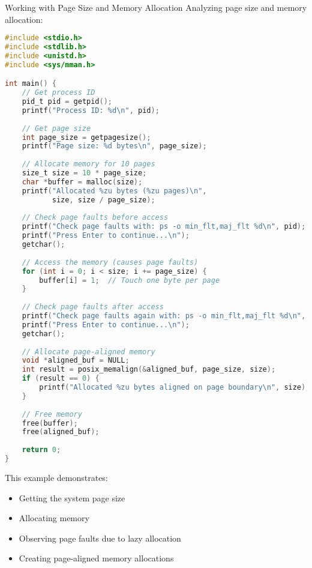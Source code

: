 \begin{example2}{Working with Page Size and Memory Allocation}
    Analyzing page size and memory allocation:
    
\begin{lstlisting}[language=C, style=basesmol]
#include <stdio.h>
#include <stdlib.h>
#include <unistd.h>
#include <sys/mman.h>

int main() {
    // Get process ID
    pid_t pid = getpid();
    printf("Process ID: %d\n", pid);
    
    // Get page size
    int page_size = getpagesize();
    printf("Page size: %d bytes\n", page_size);
    
    // Allocate memory for 10 pages
    size_t size = 10 * page_size;
    char *buffer = malloc(size);
    printf("Allocated %zu bytes (%zu pages)\n", 
           size, size / page_size);
    
    // Check page faults before access
    printf("Check page faults with: ps -o min_flt,maj_flt %d\n", pid);
    printf("Press Enter to continue...\n");
    getchar();
    
    // Access the memory (causes page faults)
    for (int i = 0; i < size; i += page_size) {
        buffer[i] = 1;  // Touch one byte per page
    }
    
    // Check page faults after access
    printf("Check page faults again with: ps -o min_flt,maj_flt %d\n", pid);
    printf("Press Enter to continue...\n");
    getchar();
    
    // Allocate page-aligned memory
    void *aligned_buf = NULL;
    int result = posix_memalign(&aligned_buf, page_size, size);
    if (result == 0) {
        printf("Allocated %zu bytes aligned on page boundary\n", size);
    }
    
    // Free memory
    free(buffer);
    free(aligned_buf);
    
    return 0;
}
\end{lstlisting}

    This example demonstrates:
    \begin{itemize}
        \item Getting the system page size
        \item Allocating memory
        \item Observing page faults due to lazy allocation
        \item Creating page-aligned memory allocations
    \end{itemize}
\end{example2}

